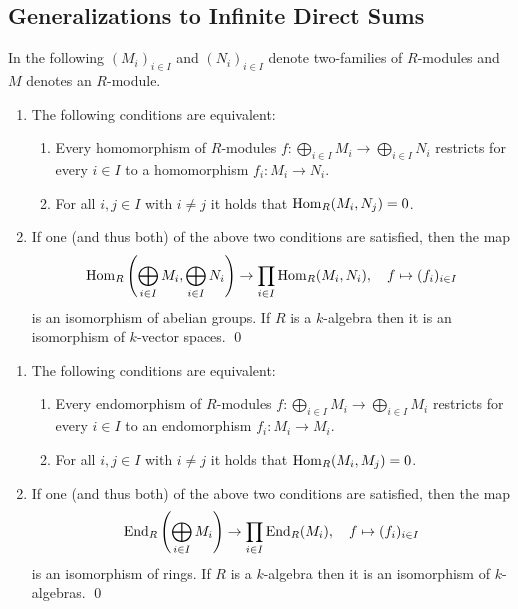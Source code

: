\subsection{Generalizations to Infinite Direct Sums}


\begin{conventions}
  In the following $(M_i)_{i \in I}$ and $(N_i)_{i \in I}$ denote two-families of $R$-modules and $M$ denotes an $R$-module.
\end{conventions}


\begin{proposition}
  \leavevmode
  \begin{enumerate}
    \item
      The following conditions are equivalent:
      \begin{enumerate}
        \item
          Every homomorphism of $R$-modules $f \colon \bigoplus_{i \in I} M_i \to \bigoplus_{i \in I} N_i$ restricts for every $i \in I$ to a homomorphism $f_i \colon M_i \to N_i$.
        \item
          For all $i, j \in I$ with $i \neq j$ it holds that $\operatorname{Hom}_R(M_i, N_j) = 0$.
      \end{enumerate}
    \item
      If one (and thus both) of the above two conditions are satisfied, then the map
      \[
                \operatorname{Hom}_R\left( \bigoplus_{i \in I} M_i, \bigoplus_{i \in I} N_i \right)
        \to     \prod_{i \in I} \operatorname{Hom}_R(M_i, N_i),
        \quad   f
        \mapsto (f_i)_{i \in I}
      \]
      is an isomorphism of abelian groups.
      If $R$ is a $k$-algebra then it is an isomorphism of $k$-vector spaces.
    \qed
  \end{enumerate}
\end{proposition}


\begin{corollary}
  \label{corollary: decomposition of endomorphism ring into product}
  \leavevmode
  \begin{enumerate}
    \item
      The following conditions are equivalent:
      \begin{enumerate}
        \item
          Every endomorphism of $R$-modules $f \colon \bigoplus_{i \in I} M_i \to \bigoplus_{i \in I} M_i$ restricts for every $i \in I$ to an endomorphism $f_i \colon M_i \to M_i$.
        \item
          For all $i, j \in I$ with $i \neq j$ it holds that $\operatorname{Hom}_R(M_i, M_j) = 0$.
      \end{enumerate}
    \item
      If one (and thus both) of the above two conditions are satisfied, then the map
      \[
                \operatorname{End}_R\left( \bigoplus_{i \in I} M_i \right)
        \to     \prod_{i \in I} \operatorname{End}_R(M_i),
        \quad   f
        \mapsto (f_i)_{i \in I}
      \]
      is an isomorphism of rings.
      If $R$ is a $k$-algebra then it is an isomorphism of $k$-algebras.
    \qed
  \end{enumerate}
\end{corollary}


